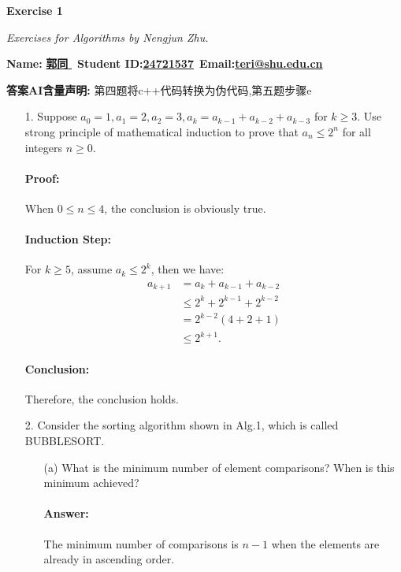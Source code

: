 \documentclass{article}
\begin{document}
\begin{center}
{\huge \textbf{Exercise 1}}

\textit{Exercises for Algorithms by Nengjun Zhu.}

\vspace{1em}
\textbf{Name:} \underline{\qquad \textbf{郭同} \qquad} \,
\textbf{Student ID:}\underline{\qquad \textbf{24721537}\qquad}\, 
\textbf{Email:}\underline{\qquad \textbf{teri@shu.edu.cn}\qquad}
\end{center}

\textbf{答案AI含量声明:} 第四题将c++代码转换为伪代码,第五题步骤e
\begin{itemize}
    


\item[1.] Suppose $a_0=1,  a_1=2, a_2=3, a_k=a_{k-1} + a_{k-2} + a_{k-3} $ for $k\geq 3$. Use strong principle of mathematical induction to prove that $a_n \leq 2^n$ for all integers $n\geq0$.

\paragraph{Proof:} When $0 \leq n \leq 4$, the conclusion is obviously true.

\paragraph{Induction Step:} For $k \geq 5$, assume $a_k \leq 2^k$, then we have:
\begin{align*}
    a_{k+1} &= a_k + a_{k-1} + a_{k-2} \\
            &\leq 2^k + 2^{k-1} + 2^{k-2} \\
            &= 2^{k-2} (4 + 2 + 1) \\
            &\leq 2^{k+1}.
\end{align*}

\paragraph{Conclusion:} Therefore, the conclusion holds.

\item[2.] {\large Consider the sorting algorithm shown in Alg.1, which is called BUBBLESORT.}
\begin{itemize}
\item[(a)] What is the minimum number of element comparisons? When is this minimum achieved?

\paragraph{Answer:} The minimum number of comparisons is $n - 1$ when the elements are already in ascending order.


\end{itemize}
\end{itemize}
\end{document}
